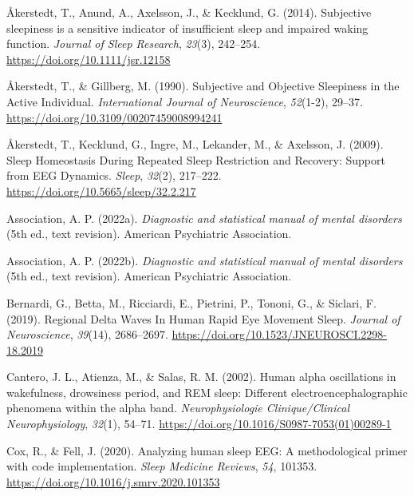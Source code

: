 \documentclass[
]{article}
\newlength{\cslhangindent}
\newenvironment{CSLReferences}[2] %
 {\begin{list}{}{%
  \setlength{\itemindent}{0pt}
  \setlength{\leftmargin}{0pt}
  \setlength{\parsep}{0pt}
  \ifodd #1
   \setlength{\leftmargin}{\cslhangindent}
   \setlength{\itemindent}{-1\cslhangindent}
  \fi
  \setlength{\itemsep}{#2\baselineskip}}}
 {\end{list}}
\begin{document}
\label{refs}
\begin{CSLReferences}{1}{0}
Åkerstedt, T., Anund, A., Axelsson, J., \& Kecklund, G. (2014).
Subjective sleepiness is a sensitive indicator of insufficient sleep and
impaired waking function. \emph{Journal of Sleep Research},
\emph{23}(3), 242--254. \url{https://doi.org/10.1111/jsr.12158}

Åkerstedt, T., \& Gillberg, M. (1990). Subjective and {Objective
Sleepiness} in the {Active Individual}. \emph{International Journal of
Neuroscience}, \emph{52}(1-2), 29--37.
\url{https://doi.org/10.3109/00207459008994241}

Åkerstedt, T., Kecklund, G., Ingre, M., Lekander, M., \& Axelsson, J.
(2009). Sleep {Homeostasis During Repeated Sleep Restriction} and
{Recovery}: {Support} from {EEG Dynamics}. \emph{Sleep}, \emph{32}(2),
217--222. \url{https://doi.org/10.5665/sleep/32.2.217}

Association, A. P. (2022a). \emph{Diagnostic and statistical manual of
mental disorders} (5th ed., text revision). American Psychiatric
Association.

Association, A. P. (2022b). \emph{Diagnostic and statistical manual of
mental disorders} (5th ed., text revision). American Psychiatric
Association.

Bernardi, G., Betta, M., Ricciardi, E., Pietrini, P., Tononi, G., \&
Siclari, F. (2019). Regional {Delta Waves In Human Rapid Eye Movement
Sleep}. \emph{Journal of Neuroscience}, \emph{39}(14), 2686--2697.
\url{https://doi.org/10.1523/JNEUROSCI.2298-18.2019}

Cantero, J. L., Atienza, M., \& Salas, R. M. (2002). Human alpha
oscillations in wakefulness, drowsiness period, and {REM} sleep:
Different electroencephalographic phenomena within the alpha band.
\emph{Neurophysiologie Clinique/Clinical Neurophysiology}, \emph{32}(1),
54--71. \url{https://doi.org/10.1016/S0987-7053(01)00289-1}

Cox, R., \& Fell, J. (2020). Analyzing human sleep {EEG}: {A}
methodological primer with code implementation. \emph{Sleep Medicine
Reviews}, \emph{54}, 101353.
\url{https://doi.org/10.1016/j.smrv.2020.101353}


\end{CSLReferences}
\end{document}
